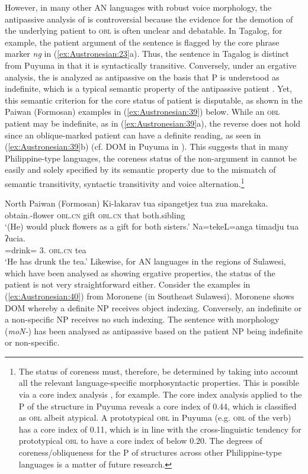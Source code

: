 \documentclass[output=paper,chinesefont]{../langscibook}
\begin{document}
However, in many other AN languages with robust voice morphology, the antipassive analysis of \AV is controversial because the evidence for the demotion of the underlying patient to \textsc{obl} is often unclear and debatable. In Tagalog, for example, the patient argument of the \AV sentence is flagged by the core phrase marker \emph{ng} in (\ref{ex:Austronesian:23}a). Thus, the \AV sentence in Tagalog is distinct from Puyuma in that it is syntactically transitive. Conversely, under an ergative analysis, the \AV is  analyzed as antipassive on the basis that P is understood as indefinite, which is a typical semantic property of the antipassive patient \citep{Hopper1980}. Yet, this semantic criterion for the core status of \AV patient is disputable, as shown in the Paiwan (Formosan) examples in (\ref{ex:Austronesian:39}) below. While an \textsc{obl} patient may be indefinite, as in (\ref{ex:Austronesian:39}a), the reverse does not hold since an oblique-marked patient can have a definite reading, as seen in (\ref{ex:Austronesian:39}b) (cf. DOM in Puyuma in ). This suggests that in many Philippine-type languages, the coreness status of the non-\SUBJ argument in \AV cannot be easily and solely specified by its semantic property due to the mismatch of semantic transitivity, syntactic transitivity and voice alternation.\footnote{The status of coreness must, therefore, be determined by taking into account all the relevant language-specific morphosyntactic properties. This is possible via a core index analysis \citep{Arka2017}, for example. The core index analysis applied to the P of the \AV structure in Puyuma reveals a core index of 0.44, which is classified as \textsc{obl} albeit atypical. A prototypical \textsc{obl} in Puyuma (e.g. \LOC \textsc{obl} of the \AV verb) has a core index of 0.11, which is in line with the cross-linguistic tendency for prototypical \textsc{obl} to have a core index of below 0.20. The degrees of coreness/obliqueness for the P of \AV structures across other Philippine-type languages is a matter of future research.}

\ea\label{ex:Austronesian:39} North Paiwan (Formosan)  \citep[114, 412]{Chang2006}
\ea\gll
Ki-lakarav   tua sipangetjez tua zua marekaka.\\
  obtain.\AV-flower \textsc{obl.cn} gift \textsc{obl.cn} that both.sibling\\
\glt `(He) would pluck flowers as a gift for both sisters.'
\ex\gll
Na=tekeL=anga timadju tua ʔucia.\\
  \PFV=drink\textlangle{\AV}{\textrangle}={\COMPL} {3\SG.\NOM} \textsc{obl.cn} tea\\
\glt `He has drunk the tea.'
\z\z
Likewise, for AN languages in the regions of Sulawesi, which have been analysed as showing ergative properties, the status of the \AV patient is not very straightforward either. Consider the examples in (\ref{ex:Austronesian:40}) from Moronene (in Southeast Sulawesi). Moronene shows DOM whereby a definite \OBJ NP receives object indexing. Conversely, an indefinite or a non-specific \OBJ NP receives no such indexing. The \AV sentence with \AV morphology (\emph{moN-}) has been analysed as antipassive \citep{Andersen2005} based on the patient NP being indefinite or non-specific.
\end{document}
